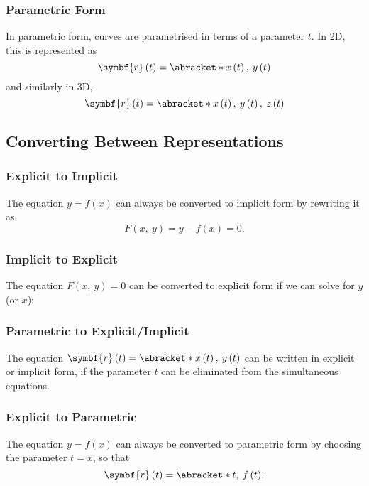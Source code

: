 \documentclass{article}
\begin{document}
\subsubsection{Parametric Form}
In parametric form, curves are parametrised in terms of a parameter \(t\).
In 2D, this is represented as
\begin{equation*}
    \symbf{r}\left( t \right) = \abracket*{x\left( t \right),\: y\left( t \right)}
\end{equation*}
and similarly in 3D,
\begin{equation*}
    \symbf{r}\left( t \right) = \abracket*{x\left( t \right),\: y\left( t \right),\: z\left( t \right)}
\end{equation*}
\subsection{Converting Between Representations}
\subsubsection{Explicit to Implicit}
The equation \(y = f\left( x \right)\) can always be converted to implicit form by rewriting it as
\begin{equation*}
    F\left( x,\: y \right) = y - f\left( x \right) = 0.
\end{equation*}
\subsubsection{Implicit to Explicit}
The equation \(F\left( x,\: y \right) = 0\) can be converted to explicit form if we can solve for \(y\) (or \(x\)):
\subsubsection{Parametric to Explicit/Implicit}
The equation \(\symbf{r}\left( t \right) = \abracket*{x\left( t \right),\: y\left( t \right)}\) can be written in
explicit or implicit form, if the parameter \(t\) can be eliminated from the simultaneous equations.
\subsubsection{Explicit to Parametric}
The equation \(y = f\left( x \right)\) can always be converted to parametric form by choosing the parameter \(t = x\), so that
\begin{equation*}
    \symbf{r}\left( t \right) = \abracket*{t,\: f\left( t \right)}.
\end{equation*}
\end{document}
